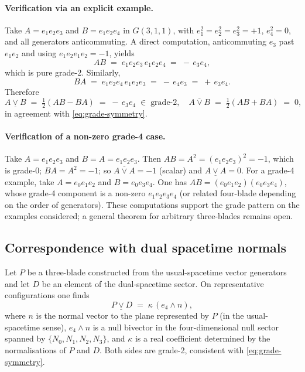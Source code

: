 \documentclass[dvipdfmx,a4paper]{article}
\theoremstyle{definition}
\theoremstyle{plain}
\theoremstyle{remark}
\begin{document}
\paragraph{Verification via an explicit example.}
Take \(A=e_{1}e_{2}e_{3}\) and \(B=e_{1}e_{2}e_{4}\) in \(G(3,1,1)\), with \(e_{1}^{2}=e_{2}^{2}=e_{3}^{2}=+1\), \(e_{4}^{2}=0\), and all generators anticommuting. A direct computation, anticommuting \(e_{3}\) past \(e_{1}e_{2}\) and using \(e_{1}e_{2}e_{1}e_{2}=-1\), yields
\[
AB \;=\; e_{1}e_{2}e_{3}\,e_{1}e_{2}e_{4} \;=\; -\,e_{3}e_{4},
\]
which is pure grade-2. Similarly,
\[
BA \;=\; e_{1}e_{2}e_{4}\,e_{1}e_{2}e_{3} \;=\; -\,e_{4}e_{3} \;=\; +\,e_{3}e_{4}.
\]
Therefore
\[
A\mathbin{\underline{\vee}}B \;=\; \tfrac{1}{2}(AB-BA) \;=\; -\,e_{3}e_{4} \;\in\; \text{grade-2},
\quad
A\mathbin{\overline{\vee}}B \;=\; \tfrac{1}{2}(AB+BA) \;=\; 0,
\]
in agreement with \eqref{eq:grade-symmetry}.

\paragraph{Verification of a non-zero grade-4 case.}
Take \(A=e_{1}e_{2}e_{3}\) and \(B=A=e_{1}e_{2}e_{3}\). Then \(AB=A^{2}=(e_{1}e_{2}e_{3})^{2}=-1\), which is grade-0; \(BA=A^{2}=-1\); so \(A\mathbin{\overline{\vee}}A=-1\) (scalar) and \(A\mathbin{\underline{\vee}}A=0\). For a grade-4 example, take \(A=e_{0}e_{1}e_{2}\) and \(B=e_{0}e_{3}e_{4}\). One has \(AB=(e_{0}e_{1}e_{2})(e_{0}e_{3}e_{4})\), whose grade-4 component is a non-zero \(e_{1}e_{2}e_{3}e_{4}\) (or related four-blade depending on the order of generators). These computations support the grade pattern on the examples considered; a general theorem for arbitrary three-blades remains open.

\subsection{Correspondence with dual spacetime normals}

Let \(P\) be a three-blade constructed from the usual-spacetime vector generators and let \(D\) be an element of the dual-spacetime sector. On representative configurations one finds
\begin{equation}
P \mathbin{\underline{\vee}} D \;=\; \kappa\,(e_{4}\wedge n),
\label{eq:appB-normal}
\end{equation}
where \(n\) is the normal vector to the plane represented by \(P\) (in the usual-spacetime sense), \(e_{4}\wedge n\) is a null bivector in the four-dimensional null sector spanned by \(\{N_{0},N_{1},N_{2},N_{3}\}\), and \(\kappa\) is a real coefficient determined by the normalisations of \(P\) and \(D\). Both sides are grade-2, consistent with \eqref{eq:grade-symmetry}.
\end{document}
